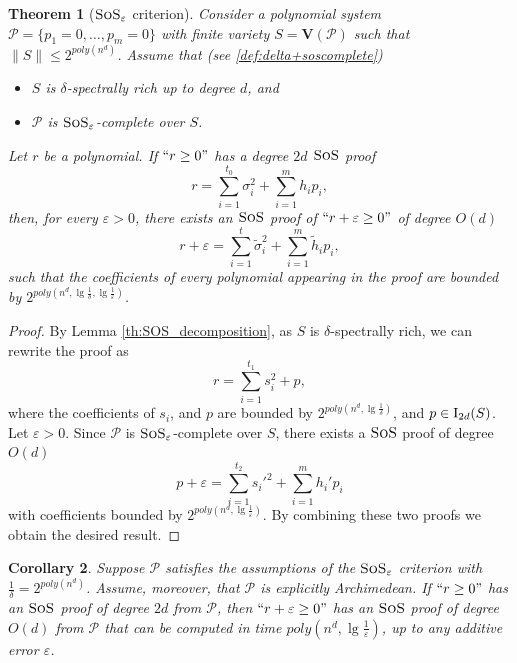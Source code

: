 \documentclass[11pt]{article}
\newcommand{\sos}{\text{\sc{SoS}}}
\newcommand{\Variety}[1]{{\textbf{V}}\left( #1 \right)}
\newcommand{\I}{\emph{$\rm{I}$}}
\newcommand{\1}{\textbf{1}}
\newtheorem{theorem}{Theorem}[section]
\newtheorem{corollary}[theorem]{Corollary}
\begin{document}
\begin{theorem}[$\sos_{\varepsilon}$ criterion]\label{th:SoS_Criterion}
    Consider a polynomial system $\mathcal{P}=\{p_1 = 0, \dots, p_m = 0\}$ with finite variety $S = \Variety{\mathcal{P}}$ such that $\| S \| \leq 2^{poly(n^d)}$.
    Assume that (see \cref{def:delta+soscomplete})
    \begin{itemize}
        \item [1)] $S$ is $\delta$-spectrally rich up to degree $d$, and
        \item [2)] $\mathcal{P}$ is $\sos_\varepsilon$-complete over $S$.
    \end{itemize}
    Let $r$ be a polynomial. If $``r \geq 0"$ has a degree $2d$ $\sos$ proof
    \begin{equation*}
        r = \sum_{i=1}^{t_0} \sigma_i^2 + \sum_{i=1}^m h_i p_i,
    \end{equation*}
    then, for every $\varepsilon>0$, there exists an $\sos$ proof of $``r+\varepsilon \geq 0"$ of degree $O(d)$
    \begin{equation}\label{eqn:SOS_criterion}
        r +\varepsilon = \sum_{i=1}^{t} \tilde{\sigma}_i^2 + \sum_{i=1}^m \tilde{h}_i p_i,
    \end{equation}
    such that the coefficients of every polynomial appearing in the proof are bounded by $2^{poly(n^d, \lg \frac{1}{\delta}, \lg \frac{1}{\varepsilon})}$.
\end{theorem}

\begin{proof}
    By Lemma \ref{th:SOS_decomposition}, as $S$ is $\delta$-spectrally rich, we can rewrite the proof as 
     \begin{equation*}
            r = \sum_{i=1}^{t_1} s_i^2 + p,
        \end{equation*}
      where the coefficients of $s_i$, and $p$ are bounded by $2^{poly(n^d, \lg\frac{1}{\delta})}$, and $p\in \I_{2d}(S)$. Let $\varepsilon > 0$. Since $\mathcal{P}$ is $\sos_\varepsilon$-complete over $S$, there exists a $\sos$ proof of degree $O(d)$
      \begin{equation*}
          p+ \varepsilon = \sum_{i=1}^{t_2}s_i'^{2} + \sum_{i=1}^{m}h_i' p_i
      \end{equation*}
      with coefficients bounded by $2^{poly(n^d , \lg \frac{1}{\varepsilon})}$. By combining these two proofs we obtain the desired result.
\end{proof}

\begin{corollary}
    Suppose $\mathcal{P}$ satisfies the assumptions of the $\sos_\varepsilon$ criterion with $\frac{1}{\delta}=2^{poly(n^d)}$. Assume, moreover, that $\mathcal{P}$ is explicitly Archimedean. If $``r\geq 0"$ has an $\sos$ proof of degree $2d$ from $\mathcal{P}$, then $``r + \varepsilon \geq 0"$ has an $\sos$ proof of degree $O(d)$ from $\mathcal{P}$ that can be computed in time $poly(n^d, \lg \frac{1}{\varepsilon})$, up to any additive error $\varepsilon$.
\end{corollary}
\end{document}
